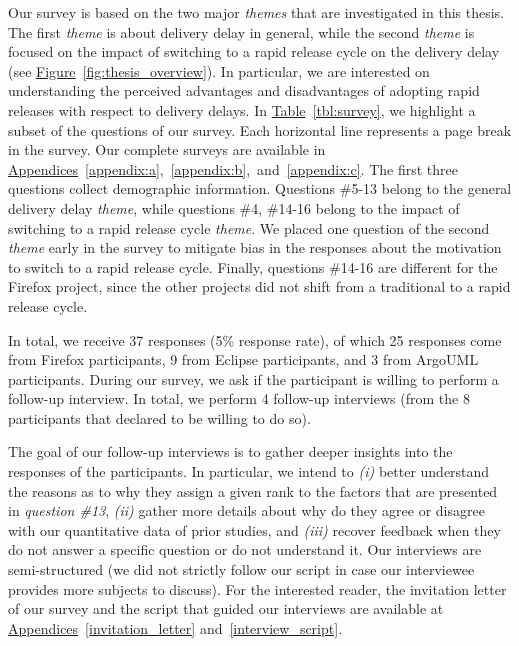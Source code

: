 Our survey is based on the two major {\em themes} that are investigated in this
thesis. The first {\em theme} is about
delivery delay in general, while the second {\em theme} is focused on the
impact of switching to a rapid release cycle on the delivery delay (see
\hyperref[fig:thesis_overview]{Figure}~\ref{fig:thesis_overview}). In
particular, we are interested on understanding the perceived advantages and disadvantages of
adopting rapid releases with respect to delivery delays. In
\hyperref[tbl:survey]{Table}~\ref{tbl:survey}, we highlight a subset of the
questions of our survey. Each horizontal line represents a page break in the
survey. Our complete surveys are available in
\hyperref[appendix:a]{Appendices}~\ref{appendix:a},~\ref{appendix:b},~and~\ref{appendix:c}.
The first three questions collect demographic information. Questions \#5-13
belong to the general delivery delay {\em theme}, while questions \#4,
\#14-16 belong to the impact of switching to a rapid release cycle {\em theme}.
We placed one question of the second {\em theme} early in the survey to mitigate
bias in the responses about the motivation to switch to a rapid release cycle.
Finally, questions \#14-16 are different for the Firefox project, since the
other projects did not shift from a traditional to a rapid release cycle. 

In total, we receive 37 responses (5\% response rate), of which 25 responses
come from Firefox participants, 9 from Eclipse participants, and 3 from ArgoUML
participants. During our survey, we ask if the participant is willing to perform
a follow-up interview. In total, we perform 4 follow-up interviews (from
the 8 participants that declared to be willing to do so).  

The goal of our follow-up interviews is to gather deeper insights into the
responses of the participants. In particular, we intend to {\em (i)} better
understand the reasons as to why they assign a given rank to the factors that
are presented in {\em question \#13}, {\em (ii)} gather more details about why
do they agree or disagree with our quantitative data of prior studies, and {\em
(iii)} recover feedback when they do not answer a specific question or do not
understand it.  Our interviews are semi-structured (\ie we did not strictly
follow our script in case our interviewee provides more subjects to discuss).
For the interested reader, the invitation letter of our survey and the script
that guided our interviews are available at
\hyperref[invitation_letter]{Appendices}~\ref{invitation_letter}
and~\ref{interview_script}.

